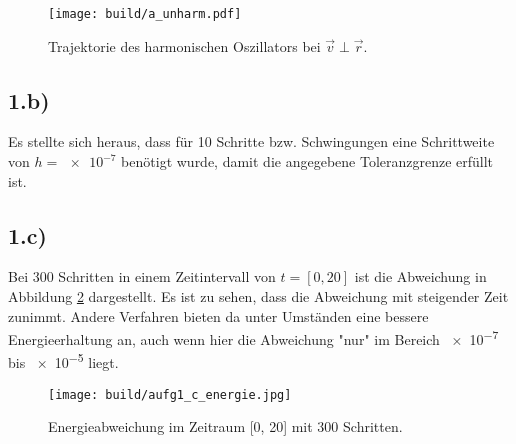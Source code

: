 \begin{figure}
  \centering
  \texttt{[image: build/a\_unharm.pdf]}
    \caption{Trajektorie des harmonischen Oszillators bei $\vec{v} \perp \vec{r}$.}
  \label{fig:unharm}
\end{figure}

\subsection*{1.b)}
Es stellte sich heraus, dass für 10 Schritte bzw. Schwingungen eine Schrittweite
von $h = \num{e-7}$ benötigt wurde, damit die angegebene Toleranzgrenze erfüllt
ist.

\subsection*{1.c)}
Bei 300 Schritten in einem Zeitintervall von $t = [0, 20]$ ist die Abweichung in
Abbildung \ref{fig:energie} dargestellt. Es ist zu sehen, dass die Abweichung mit
steigender Zeit zunimmt. Andere Verfahren bieten da unter Umständen eine bessere
Energieerhaltung an, auch wenn hier die Abweichung "nur" im Bereich \num{e-7}
bis \num{e-5} liegt. 

\begin{figure}
  \centering
  \texttt{[image: build/aufg1\_c\_energie.jpg]}
  \caption{Energieabweichung im Zeitraum [0, 20] mit 300 Schritten.}
  \label{fig:energie}
\end{figure}
